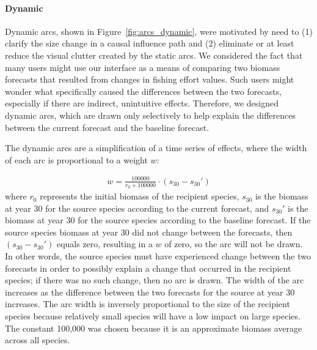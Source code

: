 \paragraph{Dynamic} \label{sec:arcDynamic}

Dynamic arcs, shown in Figure~\ref{fig:arcs_dynamic}, were motivated by need to (1) clarify the size change in a causal influence path and (2) eliminate or at least reduce the visual clutter created by the static arcs.  We considered the fact that many users might use our interface as a means of comparing two biomass forecasts that resulted from changes in fishing effort values.  Such users might wonder what specifically caused the differences between the two forecasts, especially if there are indirect, unintuitive effects.  Therefore, we designed dynamic arcs, which are drawn only selectively to help explain the differences between the current forecast and the baseline forecast.

The dynamic arcs are a simplification of a time series of effects, where the width of each arc is proportional to a weight $w$:

\begin{align}
w = \frac{100000}{r_{0} + 100000} \cdot (s_{30} - s_{30}')
\end{align}
where $r_{0}$ represents the initial biomass of the recipient species, $s_{30}$ is the biomass at year 30 for the source species according to the current forecast, and $s_{30}'$ is the biomass at year 30 for the source species according to the baseline forecast.  If the source species biomass at year 30 did not change between the forecasts, then $(s_{30} - s_{30}')$ equals zero, resulting in a $w$ of zero, so the arc will not be drawn.  In other words, the source species must have experienced change between the two forecasts in order to possibly explain a change that occurred in the recipient species; if there was no such change, then no arc is drawn.  The width of the arc increases as the difference between the two forecasts for the source at year 30 increases.  The arc width is inversely proportional to the size of the recipient species because relatively small species will have a low impact on large species.  The constant 100,000 was chosen because it is an approximate biomass average across all species.%

